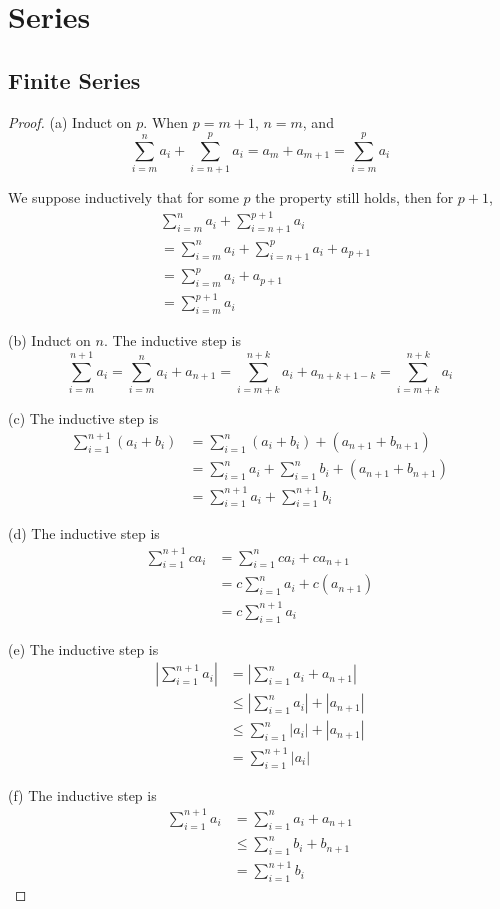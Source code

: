 \section{Series}
\subsection{Finite Series}
\begin{proof}
(a)
Induct on $p$. When $p=m+1$, $n=m$, and 
\[
\sum_{i=m}^n{a_i} + \sum_{i=n+1}^p{a_i} = a_m + a_{m+1} = \sum_{i=m}^p{a_i}
\]

We suppose inductively that for some $p$ the property still holds, then for $p+1$,
\begin{align*}
&\sum_{i=m}^n{a_i} + \sum_{i=n+1}^{p+1}{a_i}\\
&= \sum_{i=m}^n{a_i} +\sum_{i=n+1}^{p}{a_i} + a_{p+1} \tag{By def.}\\
&= \sum_{i=m}^{p}{a_i} + a_{p+1} \tag{Induction Hypothesis} \\
&= \sum_{i=m}^{p+1}{a_i} \tag{By def.} 
\end{align*}

(b)
Induct on $n$. The inductive step is 
\[
\sum_{i=m}^{n+1}a_i = \sum_{i=m}^{n}a_i + a_{n+1} = \sum_{i=m+k}^{n+k}a_i + a_{n+k+1-k} = \sum_{i=m+k}^{n+k}a_i
\]

(c)
The inductive step is
\begin{align*}
\sum_{i=1}^{n+1}{(a_i+b_i)} 
&= \sum_{i=1}^{n}{(a_i+b_i)} + (a_{n+1}+b_{n+1}) \\
&= \sum_{i=1}^{n}{a_i}+\sum_{i=1}^{n}{b_i}+ (a_{n+1}+b_{n+1}) \\
&= \sum_{i=1}^{n+1}{a_i}+\sum_{i=1}^{n+1}{b_i}
\end{align*}

(d)
The inductive step is
\begin{align*}
\sum_{i=1}^{n+1}{ca_i} 
&= \sum_{i=1}^{n}{ca_i} + ca_{n+1} \\
&= c\sum_{i=1}^{n}{a_i}+ c(a_{n+1}) \\
&= c\sum_{i=1}^{n+1}{a_i}
\end{align*}

(e) 
The inductive step is 
\begin{align*}
\left|\sum_{i=1}^{n+1}{a_i}\right|
&= \left|\sum_{i=1}^{n}{a_i} + a_{n+1}\right| \\
&\leq \left|\sum_{i=1}^{n}{a_i}\right| + \left|a_{n+1}\right| \\
&\leq \sum_{i=1}^{n}{|a_i|} + |a_{n+1}| \\
&= \sum_{i=1}^{n+1}{|a_i|}
\end{align*}

(f)
The inductive step is
\begin{align*}
\sum_{i=1}^{n+1}{a_i}
&= \sum_{i=1}^{n}{a_i} + a_{n+1} \\
&\leq \sum_{i=1}^{n}{b_i} + b_{n+1} \\
&= \sum_{i=1}^{n+1}{b_i}
\end{align*}
\end{proof}

